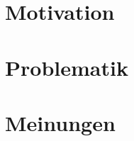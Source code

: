 
\section{Motivation} 
\label{sec:motivation}





\section{Problematik} 
\label{sec:problematik}


\section{Meinungen} 
\label{sec:meinungen}


